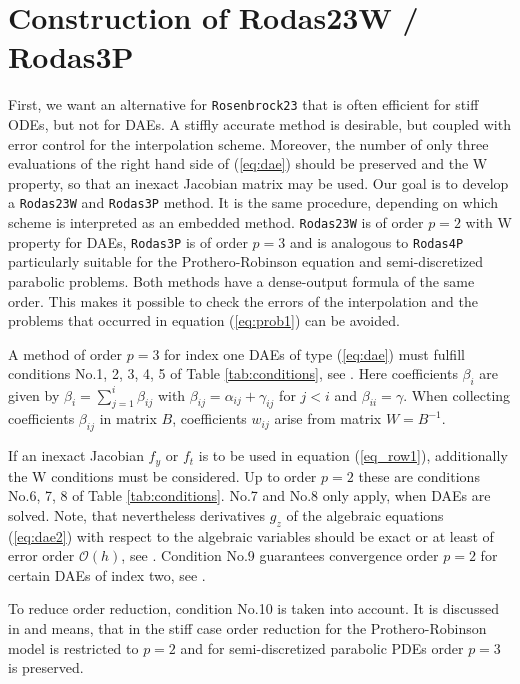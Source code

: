 \documentclass{juliacon}
\begin{document}
\section{Construction of Rodas23W / Rodas3P} \label{sec:construct}
First, we want an alternative for \verb|Rosenbrock23| that is often efficient for stiff ODEs, but not for DAEs.
A stiffly accurate method is desirable, but coupled with error control for the interpolation scheme. 
Moreover, the number of only three evaluations of the right hand side of (\ref{eq:dae}) should be preserved and the 
W property, so that an inexact Jacobian matrix may be used.
Our goal is to develop a \verb|Rodas23W| and \verb|Rodas3P| method. It is the same procedure, depending on which 
scheme is interpreted as an embedded method. 
\verb|Rodas23W| is of order $p=2$ with W property for DAEs, \verb|Rodas3P| is of order $p=3$ and is analogous 
to \verb|Rodas4P| particularly 
suitable for the Prothero-Robinson equation and semi-discretized parabolic problems.
Both methods have a dense-output formula of the same order. This makes it possible to check the errors of the 
interpolation and the problems that occurred in equation (\ref{eq:prob1}) can be avoided.

A method of order $p=3$ for index one DAEs of type (\ref{eq:dae}) must fulfill conditions No.1, 2, 3, 4, 5 of Table \ref{tab:conditions}, see \cite{hairer,roche}.
Here coefficients $\beta_{i}$ are given by $\beta_i = \sum_{j=1}^i \beta_{i j}$ with
$\beta_{i j}= \alpha_{i j} + \gamma_{i j}$ for $j < i$ and $\beta_{i i} = \gamma$.
When collecting coefficients $\beta_{ij}$ in matrix $B$, coefficients $w_{ij}$ arise from matrix $W = B^{-1}$.

If an inexact Jacobian $f_y$ or $f_t$ is to be used in equation (\ref{eq_row1}), additionally the W conditions must be considered.
Up to order $p=2$ these are conditions No.6, 7, 8 of Table  \ref{tab:conditions}.
No.7 and No.8 only apply, when DAEs are solved. Note, that nevertheless derivatives $g_z$ of the algebraic equations (\ref{eq:dae2}) with respect to the 
algebraic variables should be exact
or at least of error order $\mathcal{O}(h)$, see \cite{jax2}.
Condition No.9 guarantees convergence order $p=2$ for certain DAEs of index two, see \cite{lubich}.

To reduce order reduction, condition No.10 is taken into account. It is discussed in \cite{scholz,rodas5p} and
means, that in the stiff case order reduction for the Prothero-Robinson model is restricted to $p=2$ and for semi-discretized parabolic PDEs
order $p=3$ is preserved.
\end{document}
